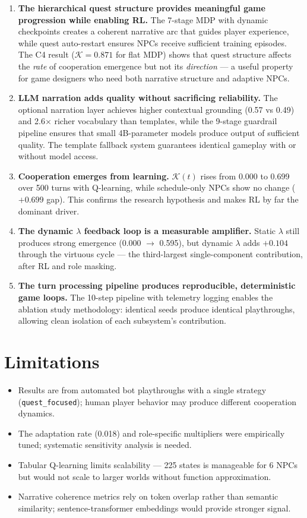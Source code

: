 \documentclass[12pt, a4paper, oneside]{report}
\begin{document}
\begin{enumerate}
    \item \textbf{The hierarchical quest structure provides meaningful game progression while enabling RL.} The 7-stage MDP with dynamic checkpoints creates a coherent narrative arc that guides player experience, while quest auto-restart ensures NPCs receive sufficient training episodes. The C4 result ($\mathcal{K} = 0.871$ for flat MDP) shows that quest structure affects the \textit{rate} of cooperation emergence but not its \textit{direction} --- a useful property for game designers who need both narrative structure and adaptive NPCs.
    \item \textbf{LLM narration adds quality without sacrificing reliability.} The optional narration layer achieves higher contextual grounding (0.57 vs 0.49) and 2.6$\times$ richer vocabulary than templates, while the 9-stage guardrail pipeline ensures that small 4B-parameter models produce output of sufficient quality. The template fallback system guarantees identical gameplay with or without model access.
    \item \textbf{Cooperation emerges from learning.} $\mathcal{K}(t)$ rises from 0.000 to 0.699 over 500 turns with Q-learning, while schedule-only NPCs show no change ($+0.699$ gap). This confirms the research hypothesis and makes RL by far the dominant driver.
    \item \textbf{The dynamic $\lambda$ feedback loop is a measurable amplifier.} Static $\lambda$ still produces strong emergence (0.000 $\to$ 0.595), but dynamic $\lambda$ adds $+0.104$ through the virtuous cycle --- the third-largest single-component contribution, after RL and role masking.
    \item \textbf{The turn processing pipeline produces reproducible, deterministic game loops.} The 10-step pipeline with telemetry logging enables the ablation study methodology: identical seeds produce identical playthroughs, allowing clean isolation of each subsystem's contribution.
\end{enumerate}

\section{Limitations}
\label{sec:limitations}

\begin{itemize}[nosep]
    \item Results are from automated bot playthroughs with a single strategy (\texttt{quest\_focused}); human player behavior may produce different cooperation dynamics.
    \item The adaptation rate (0.018) and role-specific multipliers were empirically tuned; systematic sensitivity analysis is needed.
    \item Tabular Q-learning limits scalability --- 225 states is manageable for 6 NPCs but would not scale to larger worlds without function approximation.
    \item Narrative coherence metrics rely on token overlap rather than semantic similarity; sentence-transformer embeddings would provide stronger signal.
\end{itemize}
\end{document}
